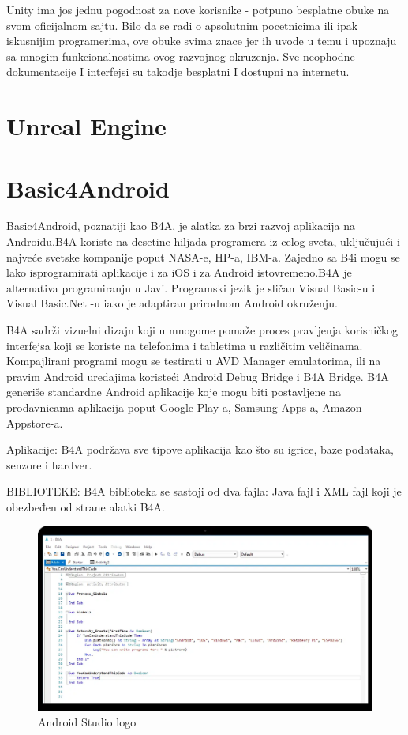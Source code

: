 \documentclass[12pt]{article}
\begin{document}
Unity ima jos jednu pogodnost za nove korisnike - potpuno besplatne obuke na svom oficijalnom sajtu.
Bilo da se radi o apsolutnim pocetnicima ili ipak iskusnijim programerima, ove obuke svima znace jer ih uvode u temu i upoznaju sa mnogim      funkcionalnostima ovog razvojnog okruzenja.
Sve neophodne dokumentacije I interfejsi su takodje besplatni I dostupni na internetu.

\section{Unreal Engine}

\section{Basic4Android}
\hspace*{1cm} Basic4Android, poznatiji kao B4A, je alatka za brzi razvoj aplikacija na Androidu.B4A koriste na desetine hiljada programera iz celog sveta, uključujući i najveće svetske kompanije poput NASA-e, HP-a, IBM-a.
Zajedno sa B4i mogu se lako isprogramirati aplikacije i za iOS i za Android istovremeno.B4A je alternativa programiranju u Javi. Programski jezik je sličan Visual Basic-u i Visual Basic.Net -u iako je adaptiran prirodnom Android okruženju.

B4A sadrži vizuelni dizajn koji u mnogome pomaže proces pravljenja korisničkog interfejsa koji se koriste na telefonima i tabletima u različitim veličinama. Kompajlirani programi mogu se testirati u AVD Manager emulatorima, ili na pravim Android uređajima koristeći Android Debug Bridge i B4A Bridge. 
B4A generiše standardne Android aplikacije koje mogu biti postavljene na prodavnicama aplikacija poput Google Play-a, Samsung Apps-a, Amazon Appstore-a.

Aplikacije:
B4A podržava sve tipove aplikacija kao što su igrice, baze podataka, senzore i hardver.

BIBLIOTEKE:
B4A biblioteka se sastoji od dva fajla: Java fajl i XML fajl koji je obezbeđen od strane alatki B4A.
\begin{figure}[ht!]
    \centering
    \includegraphics[scale=0.05]{tnppppp.webp}
    \caption{Android Studio logo}
\end{figure}
\end{document}
